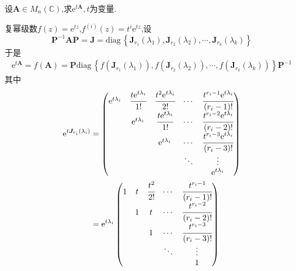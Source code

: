 \begin{brown}
    \begin{example}
        设$\bm{A}\in M_n\left(\mathbb{C}\right)$,求$\mathrm{e}^{t\bm{A}},t$为变量.
    \end{example}
    \begin{solution}
        复幂级数$f\left(z\right)=\mathrm{e}^{tz}$,$f^{\left(i\right)}\left(z\right)=t^i\mathrm{e}^{tz}$,设\[
        \bm{P}^{-1}\bm{A}\bm{P}=\bm{J}=\mathrm{diag}\,\left\{
            \bm{J}_{r_1}\left(\lambda_1\right),\bm{J}_{r_2}\left(\lambda_2\right),\cdots,\bm{J}_{r_k}\left(\lambda_k\right)
        \right\}
        \]于是\begin{align*}
            \mathrm{e}^{t\bm{A}}=f\left(\bm{A}\right)=\bm{P}\mathrm{diag}\,\left\{
                f\left(
                    \bm{J}_{r_1}\left(\lambda_1\right)
                \right),f\left(
                    \bm{J}_{r_2}\left(\lambda_2\right)
                \right),\cdots,f\left(
                    \bm{J}_{r_k}\left(\lambda_k\right)
                \right)
            \right\}\bm{P}^{-1}
        \end{align*}其中\begin{align*}
            \mathrm{e}^{t\bm{J}_{r_i}\left(\lambda_i\right)}&=\begin{pmatrix}
                \mathrm{e}^{t\lambda_i}&\cfrac{t\mathrm{e}^{t\lambda_i}}{1!}&\cfrac{t^2\mathrm{e}^{t\lambda_i}}{2!}&\cdots&\cfrac{t^{r_i-1}\mathrm{e}^{t\lambda_i}}{\left(r_i-1\right)!}\\
                &\mathrm{e}^{t\lambda_i}&\cfrac{t\mathrm{e}^{t\lambda_i}}{1!}&\cdots&\cfrac{t^{r_i-2}\mathrm{e}^{t\lambda_i}}{\left(r_i-2\right)!}\\
                &&\mathrm{e}^{t\lambda_i}&\cdots&\cfrac{t^{r_i-3}\mathrm{e}^{t\lambda_i}}{\left(r_i-3\right)!}\\
                &&&\ddots&\vdots\\
                &&&&\mathrm{e}^{t\lambda_i}
            \end{pmatrix}\\
            &=\mathrm{e}^{t\lambda_i}\begin{pmatrix}
                1&t&\cfrac{t^2}{2!}&\cdots&\cfrac{t^{r_i-1}}{\left(r_i-1\right)!}\\
                &1&t&\cdots&\cfrac{t^{r_i-2}}{\left(r_i-2\right)!}\\
                &&1&\cdots&\cfrac{t^{r_i-3}}{\left(r_i-3 \right)!}\\
                &&&\ddots&\vdots\\
                &&&&1
            \end{pmatrix}
        \end{align*}
    \end{solution}
\end{brown}